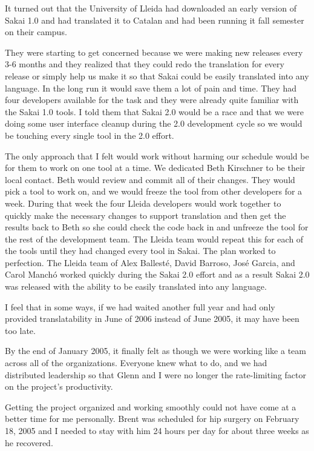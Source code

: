 \documentclass[12pt]{book}
\begin{document}
It turned out that the University of Lleida had downloaded
an early version of Sakai 1.0 and had translated
it to Catalan and had been
running it fall semester on their campus.

They were starting to get concerned because we were making
new releases every 3-6 months and they realized that
they could redo the translation for every release or simply
help us make it so that Sakai could be easily translated
into any language.  In the long run it would save them a lot
of pain and time.
They had four developers available for the task and they were
already quite familiar with the Sakai 1.0 tools.  I told them
that Sakai 2.0 would be a race and that we were doing some
user interface cleanup during the 2.0 development cycle so
we would be touching every single tool in the 2.0 effort.

The only approach that I felt would work without harming our
schedule would be for them to work on one tool at a time.
We dedicated Beth Kirschner to be their local contact.  Beth would
review and commit all of their changes.  They would pick a tool
to work on, and we would freeze the tool from other developers
for a week.  During that week the four Lleida developers would
work together to quickly make the necessary changes to support
translation and then get the results back to Beth so she could
check the code back in and unfreeze the tool for the rest of
the development team.  The Lleida team would repeat this
for each of the tools until they had changed every tool in Sakai.
The plan worked to perfection.  The Lleida team of
Alex Ballest\'{e}, David Barroso, Jos\'{e} Garcia,
and Carol Manch\'{o} worked quickly during the
Sakai 2.0 effort and as a
result Sakai 2.0 was released with the ability to be easily
translated into any language.

I feel that in some ways, if we had waited another full year
and had only provided translatability in June of 2006 instead
of June 2005, it may have been too late.

By the end of January 2005, it finally felt as though we were working
like a team across all of the organizations.  Everyone knew
what to do, and we had distributed leadership so that Glenn and
I were no longer the rate-limiting factor on the project's
productivity.

Getting the project organized and working smoothly could
not have come at a better time for me personally. Brent was
scheduled for hip surgery on February 18, 2005 and I needed
to stay with him 24 hours per day for about three weeks
as he recovered.
\end{document}
